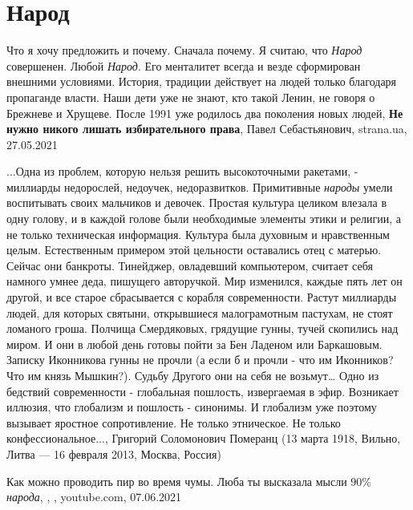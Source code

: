  
 
 
 
 
\chapter{Народ}
\label{sec:slova.narod}

Что я хочу предложить и почему. Сначала почему. Я считаю, что \emph{Народ}
совершенен. Любой \emph{Народ}. Его менталитет всегда и везде сформирован
внешними условиями. История, традиции действует на людей только благодаря
пропаганде власти. Наши дети уже не знают, кто такой Ленин, не говоря о
Брежневе и Хрущеве. После 1991 уже родилось два поколения новых людей,
\textbf{Не нужно никого лишать избирательного права}, Павел Себастьянович,
strana.ua, 27.05.2021

...Одна из проблем, которую нельзя решить высокоточными ракетами, - миллиарды
недорослей, недоучек, недоразвитков. Примитивные \emph{народы} умели
воспитывать своих мальчиков и девочек. Простая культура целиком влезала в одну
голову, и в каждой голове были необходимые элементы этики и религии, а не
только техническая информация. Культура была духовным и нравственным целым.
Естественным примером этой цельности оставались отец с матерью. Сейчас они
банкроты. Тинейджер, овладевший компьютером, считает себя намного умнее деда,
пишущего авторучкой.  Мир изменился, каждые пять лет он другой, и все старое
сбрасывается с корабля современности. Растут миллиарды людей, для которых
святыни, открывшиеся малограмотным пастухам, не стоят ломаного гроша. Полчища
Смердяковых, грядущие гунны, тучей скопились над миром. И они в любой день
готовы пойти за Бен Ладеном или Баркашовым. Записку Иконникова гунны не прочли
(а если б и прочли - что им Иконников? Что им князь Мышкин?). Судьбу Другого
они на себя не возьмут… Одно из бедствий современности - глобальная пошлость,
извергаемая в эфир.  Возникает иллюзия, что глобализм и пошлость - синонимы. И
глобализм уже поэтому вызывает яростное сопротивление. Не только этническое. Не
только конфессиональное...,
Григорий Соломонович Померанц (13 марта 1918, Вильно, Литва — 16 февраля 2013, Москва, Россия)

Как можно проводить пир во время чумы. Люба ты высказала мысли 90\% \emph{народа},
, 
,
youtube.com, 07.06.2021

